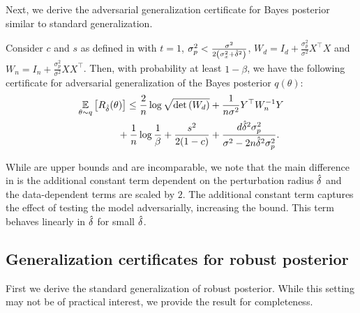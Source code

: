Next, we derive the adversarial generalization certificate for Bayes posterior similar to standard generalization.

\begin{theorem}\label{thm:std_post_adv_loss}
Consider $c$ and $s$ as defined in  with $t=1$, $\sigma_p^2 < \frac{\sigma^2}{2 \left( \sigma_x^2 + \hat{\delta}^2\right)}$, $W_d= I_d + \frac{\sigma_p^2}{\sigma^2} X^\top X$ and $W_n= I_n + \frac{\sigma_p^2}{\sigma^2} XX^\top$. Then, with probability at least $1-\beta$, we have the following certificate for adversarial generalization of the Bayes posterior ${q}(\theta)$: 
\begin{align}
&\underset{\theta\sim q}{\mathbb{E}}\left[  {R}_{\hat{\delta}}(\theta)\right] \leq \frac{2}{n} \log \sqrt{\det \left( W_d \right)} + \frac{1}{n\sigma^2} Y^\top W_n^{-1} Y \nonumber \\
&\qquad \qquad + \frac{1}{n} \log \frac{1}{\beta}  +\frac{s^2}{2(1-c)} + \frac{d\hat{\delta}^2 \sigma_p^2}{\sigma^2-2n\hat{\delta}^2 \sigma_p^2}. 
\label{eq:pac_bayes_std_post_adv_loss}
\end{align}
\end{theorem}

While  are upper bounds and are incomparable, we note that the main difference in  is the additional constant term dependent on the perturbation radius $\hat{\delta}$ and the data-dependent terms are scaled by $2$. 
The additional constant term captures the effect of testing the model adversarially, increasing the bound. 
This term behaves linearly in $\hat{\delta}$ for small $\hat{\delta}$.

\subsection{Generalization certificates for robust posterior}
\label{ss:robust_cert}

First we derive the standard generalization of robust posterior. While this setting may not be of practical interest, we provide the result for completeness.

